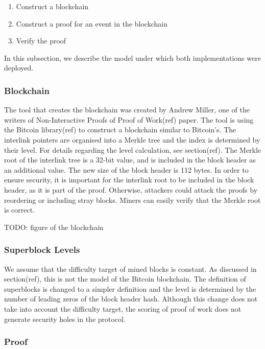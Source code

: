 \begin{enumerate}
    \item
        Construct a blockchain
    \item
        Construct a proof for an event in the blockchain
    \item
        Verify the proof
\end{enumerate}

In this subsection, we describe the model under which both
implementations were deployed.

\subsubsection{Blockchain}

The tool that creates the blockchain was created by Andrew Miller, one
of the writers of Non-Interactive Proofs of Proof of Work(ref) paper.
The tool is using the Bitcoin library(ref) to construct a blockchain
similar to Bitcoin’s. The interlink pointers are organised into a
Merkle tree and the index is determined by their level. For details
regarding the level calculation, see section(ref). The Merkle root of
the interlink tree is a 32-bit value, and is included in the
block header as an additional value. The new size of the block header
is 112 bytes. In order to ensure security, it is important for the
interlink root to be included in the block header, as it is part of
the proof. Otherwise, attackers could attack the proofs by reordering
or including stray blocks. Miners can easily verify that the Merkle
root is correct.

TODO: figure of the blockchain

\subsubsection{Superblock Levels}

We assume that the difficulty target of mined blocks is constant. As
discussed in section(ref), this is not the model of the Bitcoin
blockchain. The definition of superblocks is changed to a simpler
definition and the level is determined by the number of leading zeros
of the block header hash. Although this change does not take into
account the difficulty target, the scoring of proof of work does not
generate security holes in the protocol.

\subsubsection{Proof}

